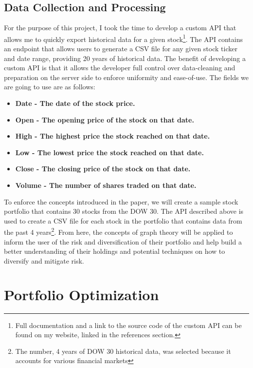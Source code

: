 \documentclass{article}
\begin{document}
\subsection{Data Collection and Processing}

For the purpose of this project, I took the time to develop a custom API that allows me to quickly export historical data for a given stock\footnote{Full documentation and a link to the source code of the custom API can be found on my website, linked in the references section.}. The API contains an endpoint that allows users to generate a CSV file for any given stock ticker and date range, providing 20 years of historical data. The benefit of developing a custom API is that it allows the developer full control over data-cleaning and preparation on the server side to enforce uniformity and ease-of-use. The fields we are going to use are as follows:

\begin{itemize}
    \item \bf{Date} - The date of the stock price. 
    \item \bf{Open} - The opening price of the stock on that date.
    \item \bf{High} - The highest price the stock reached on that date.
    \item \bf{Low} - The lowest price the stock reached on that date.
    \item \bf{Close} - The closing price of the stock on that date.
    \item \bf{Volume} - The number of shares traded on that date.
\end{itemize}

To enforce the concepts introduced in the paper, we will create a sample stock portfolio that contains 30 stocks from the DOW 30. The API described above is used to create a CSV file for each stock in the portfolio that contains data from the past 4 years\footnote{The number, 4 years of DOW 30 historical data, was selected because it accounts for various financial markets}. From here, the concepts of graph theory will be applied to inform the user of the risk and diversification of their portfolio and help build a better understanding of their holdings and potential techniques on how to diversify and mitigate risk.

\section{Portfolio Optimization}
\end{document}
